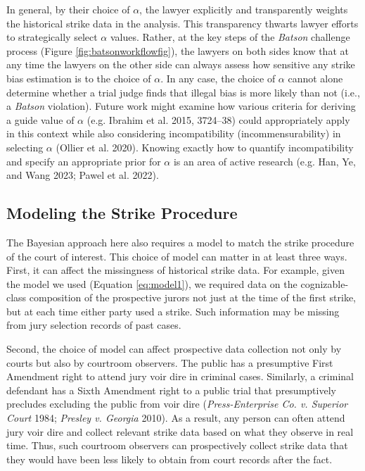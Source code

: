 \documentclass[12pt]{article}
\begin{document}
In general, by their choice of \(\alpha\), the lawyer explicitly and transparently weights the historical strike data in the analysis. This transparency thwarts lawyer efforts to strategically select \(\alpha\) values. Rather, at the key steps of the \emph{Batson} challenge process (Figure \ref{fig:batsonworkflowfig}), the lawyers on both sides know that at any time the lawyers on the other side can always assess how sensitive any strike bias estimation is to the choice of \(\alpha\). In any case, the choice of \(\alpha\) cannot alone determine whether a trial judge finds that illegal bias is more likely than not (i.e., a \emph{Batson} violation). Future work might examine how various criteria for deriving a guide value of \(\alpha\) (e.g. Ibrahim et al. 2015, 3724--38) could appropriately apply in this context while also considering incompatibility (incommensurability) in selecting \(\alpha\) (Ollier et al. 2020). Knowing exactly how to quantify incompatibility and specify an appropriate prior for \(\alpha\) is an area of active research (e.g. Han, Ye, and Wang 2023; Pawel et al. 2022).

\hypertarget{modeling-the-strike-procedure}{%
\subsection{Modeling the Strike Procedure}\label{modeling-the-strike-procedure}}

The Bayesian approach here also requires a model to match the strike procedure of the court of interest. This choice of model can matter in at least three ways. First, it can affect the missingness of historical strike data. For example, given the model we used (Equation \eqref{eq:model1}), we required data on the cognizable-class composition of the prospective jurors not just at the time of the first strike, but at each time either party used a strike. Such information may be missing from jury selection records of past cases.

Second, the choice of model can affect prospective data collection not only by courts but also by courtroom observers. The public has a presumptive First Amendment right to attend jury voir dire in criminal cases. Similarly, a criminal defendant has a Sixth Amendment right to a public trial that presumptively precludes excluding the public from voir dire (\emph{{Press-Enterprise Co. v. Superior Court}} 1984; \emph{Presley v. Georgia} 2010). As a result, any person can often attend jury voir dire and collect relevant strike data based on what they observe in real time. Thus, such courtroom observers can prospectively collect strike data that they would have been less likely to obtain from court records after the fact.
\end{document}
